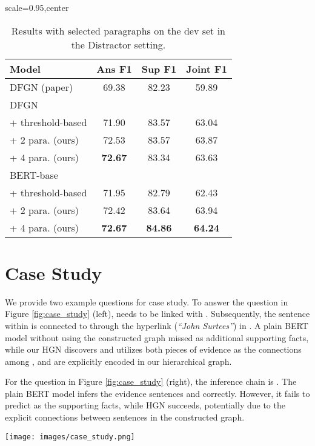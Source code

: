 \documentclass[11pt,a4paper]{article}
\begin{document}
\begin{table}[h!]
\centering
\begin{adjustbox}{scale=0.95,center}
\begin{tabular}{lccc}
\hline
Model & Ans F1 & Sup F1  & Joint F1 \\ \hline
DFGN (paper)  & 69.38  & 82.23  & 59.89 \\ \hline
DFGN   & 
   &   & \\
+ threshold-based  & 
 71.90  & 83.57  & 63.04 \\
+ 2 para. (ours)  & 72.53  & 83.57  & 63.87 \\ 
+ 4 para. (ours)   & \textbf{72.67}  & 83.34  & 63.63 \\ \hline
BERT-base   &   &   &  \\
+ threshold-based  & 71.95  & 82.79  & 62.43 \\
+ 2 para. (ours)  & 72.42  & 83.64 & 63.94 \\
+ 4 para. (ours)  & \textbf{72.67} & \textbf{84.86}  & \textbf{64.24} \\ \hline
\end{tabular}
\end{adjustbox}
\caption{\label{table:MRC-PS}Results with selected paragraphs on the dev set in the Distractor setting. 
}
\end{table}



\section{Case Study}
We provide two example questions for case study.
To answer the question in Figure \ref{fig:case_study} (left),  needs to be linked with . Subsequently, the sentence  within  is connected to  through the hyperlink (\emph{``John Surtees''}) in . A plain BERT model without using the constructed graph missed  as additional supporting facts, while our HGN discovers and utilizes both pieces of evidence as the connections among ,  and  are explicitly encoded in our hierarchical graph.  

For the question in Figure \ref{fig:case_study} (right), 
the inference chain is . The plain BERT model infers the evidence sentences  and  correctly. However, it fails to predict  as the supporting facts, while HGN succeeds, potentially due to the explicit connections between sentences in the constructed graph.

\begin{figure*}[t!]
\centering
{\texttt{[image: images/case\_study.png]}}
\caption{\label{fig:example} Examples of supporting facts prediction in the HotpotQA Distractor setting.}
\label{fig:case_study}
\end{figure*}
\end{document}
